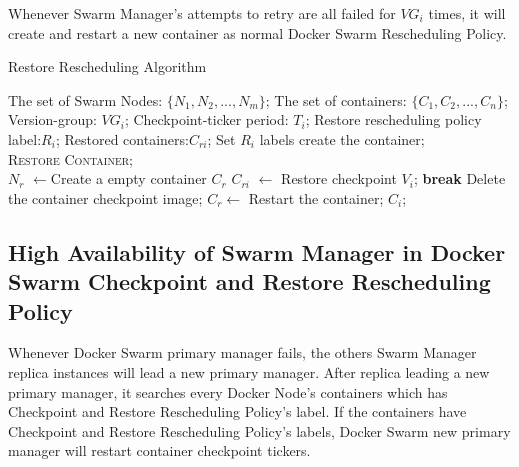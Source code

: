 Whenever Swarm Manager's attempts to retry are all failed for $ VG_i $ times, it will create and restart a new container as normal Docker Swarm Rescheduling Policy.

\begin{algorithm}[h]
    \caption{Restore Rescheduling Algorithm}
    \label{code:Restore}
    \begin{algorithmic}[1]
    	\Require
		The set of Swarm Nodes: $ \lbrace N_1,N_2,...,N_m \rbrace $;
		The set of containers: $ \lbrace C_1,C_2,...,C_n \rbrace $;
		Version-group: $ VG_i $;
		Checkpoint-ticker period: $ T_i $;
		Restore rescheduling policy label:$ R_i $;
	\Ensure
		Restored containers:$ C_{ri} $;
        \State Set $ R_i $ labels create the container;
        \\
        		\State \textsc{Restore Container};
        	\EndFor
        \EndIf
        \\
			\State $ N_r $ $\longleftarrow$Create a empty container $ C_r $
				\State $ C_{ri} $ $\longleftarrow$ Restore checkpoint $ V_i $;
					\State \textbf{break}
				\EndIf
			\EndFor
			\State Delete the container checkpoint image;
				\State $ C_r \longleftarrow $ Restart the container; $C_i$;
			\EndIf
		\EndProcedure
	\end{algorithmic}
\end{algorithm}

\subsection{High Availability of Swarm Manager in Docker Swarm Checkpoint and Restore Rescheduling Policy}
Whenever Docker Swarm primary manager fails, the others Swarm Manager replica instances will lead a new primary manager. After replica leading a new primary manager, it searches every Docker Node's containers which has Checkpoint and Restore Rescheduling Policy's label. If the containers have Checkpoint and Restore Rescheduling Policy's labels, Docker Swarm new primary manager will restart container checkpoint tickers.